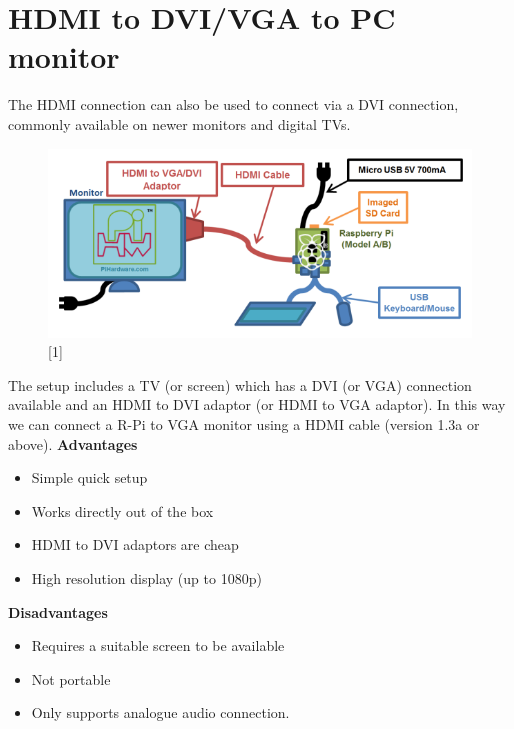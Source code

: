 \documentclass[11pt,a4paper]{article}
\begin{document}
		\section{HDMI to DVI/VGA to PC monitor}
		The HDMI connection can also be used to connect via a DVI connection, commonly available on newer monitors and digital TVs.
		\begin{figure}[h!]
			\includegraphics[scale=0.5]{pc.png}
			\centering
			\caption{[1]}
		\end{figure}
		
		The setup includes a TV (or screen) which has a DVI (or VGA) connection available and an HDMI to DVI adaptor (or HDMI to VGA adaptor). In this way we can connect a R-Pi to VGA monitor using a HDMI cable (version 1.3a or above).
		\textbf{Advantages}
		\begin{itemize}
			\item Simple quick setup
			\item Works directly out of the box
			\item HDMI to DVI adaptors are cheap
			\item High resolution display (up to 1080p)
		\end{itemize}
		
		\textbf{Disadvantages}
		\begin{itemize}
			\item Requires a suitable screen to be available 
			\item Not portable 
			\item Only supports analogue audio connection.
		\end{itemize}
		
		\newpage
\end{document}
